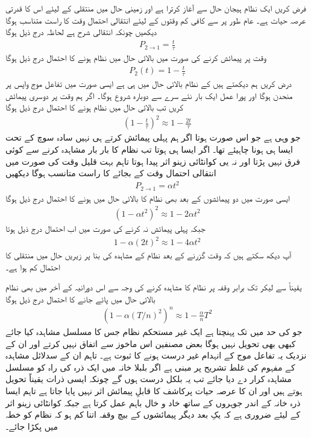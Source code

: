 فرض کریں ایک نظام ہیجان حال  سے آغاز کرترا ہے اور زمینی حال  میں منتقلی کے لیئے اس کا قدرتی عرصہ حیات  ہے۔ عام طور پر  سے کافی کم وقتوں کے لیئے انتقالی احتمال وقت  کا راست متناسب ہوگا  دیکھیں چونکہ انتقالی شرح  ہے لحاظہ درج ذیل ہوگا 
\begin{align}
	P_{2\to1}=\frac{t}{\tau}
\end{align}
وقت  پر پیمائش کرنے کی صورت میں بالائی حال میں نظام ہونے کا احتمال درج ذیل ہوگا
\begin{align}
	P_2(t)=1-\frac{t}{\tau}
\end{align}
درض کریں ہم دیکھتے ہیں کے نظام بالائی حال میں ہی ہے ایسی صورت میں تفاعل موج واپس  پر منحدن ہوگا اور پورا عمل ایک بار نئے سرے سے دوبارہ شروع ہوگا۔ اگر ہم وقت  پر دوسری پیمائش کریں تب بالائی حال میں نظام ہونے کا احتمال درج ذیل ہوگا 
\begin{align}
	\left(1-\frac{t}{\tau}\right)^2\approx1-\frac{2t}{\tau}
\end{align}
جو وہی ہے جو اس صورت ہوتا اگر ہم پہلی پیمائش کرتے ہی نہیں سادہ سوچ کے تحت ایسا ہی ہونا چاہیئے تھا۔ اگر ایسا ہی ہوتا تب نظام کا بار بار مشاہدہ کرنے سے کوئی فرق نہیں پڑتا اور نہ یی کوانٹائی زینو اثر پیدا ہوتا تاہم بہت قلیل وقت کی صورت میں انتقالی احتمال وقت  کے بجائے  کا راست متانسب ہوگا  دیکھیں
\begin{align}
	P_{2\to1}=\alpha t^2
\end{align}
ایسی صورت میں دو پیمائشوں کے بعد بھی نظام کا بالائی حال میں ہونے کا احتمال درج ذیل ہوگا
\begin{align}
	\left(1-\alpha t^2\right)^2\approx 1-2\alpha t^2
\end{align}
جبکہ پہلی پیمائش نہ کرنے کی صورت میں اب احتمال درج ذیل ہوتا
\begin{align}
	1-\alpha(2t)^2\approx1-4\alpha t^2
\end{align}
آپ دیکھ سکتے ہیں کہ وقت  گزرنے کے بعد نظام کے مشاہدہ کی بنا پر زیریں حال میں منتقلی کا احتمال کم ہوا ہے۔

یقیناً  سے لیکر  تک  برابر وقفہ  پر نظام کا مشاہدہ کرنے کی وجہ سے اس دورانیہ کے آخر میں بھی نظام بالائی حال میں پائے جانے کا احتمال درج ذیل ہوگا
\begin{align}
	\left(1-\alpha(T/n)^2\right)^n\approx1-\frac{\alpha}{n}T^2
\end{align}
جو  کی حد میں  تک پہنچتا ہے ایک غیر مستحکم نظام جس کا مسلسل مشاہدہ کیا جائے کبھی بھی تحویل نہیں ہوگا بعض مصنفین اس ماخوز سے اتفاق نہیں کرتے اور ان کے نزدیک یہ تفاعل موج کے انہدام غیر درست ہونے کا ثبوت ہے۔ تاہم ان کے سدلائل مشاہدہ کے مفہوم کی غلط تشریح پر مبنی ہے اگر بلبلا خانہ میں ایک ذرہ کی راہ کو مسلسل مشاہدہ کرار دے دیا جائے تب یہ بلکل درست ہوں گے چونکہ ایسی ذرات یقیناً تحویل ہوتے ہیں اور ان کا عرصہ حیات پرکاشف کا قابلِ پیمائش اثر نہیں پایا جاتا ہے تاہم ایسا ذرہ خانہ کے اندر جوہروں کے ساتھ خاد و خال  باہم عمل کرتا ہے جبکہ کوانٹائی زینو اثر کے لیئے ضروری ہے کہ یکِ بعد دیگر پیمائشوں کے بیچ وقفہ اتنا کم ہو کہ نظام کو  خطہ میں پکڑا جائے۔

